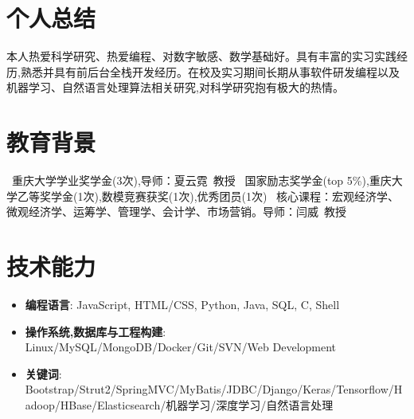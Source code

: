 \documentclass{resume}
\begin{document}


 
\section{个人总结}
本人热爱科学研究、热爱编程、对数字敏感、数学基础好。具有丰富的实习实践经历,熟悉并具有前后台全栈开发经历。在校及实习期间长期从事软件研发编程以及机器学习、自然语言处理算法相关研究,对科学研究抱有极大的热情。

\section{教育背景}
\ 重庆大学学业奖学金(3次),导师：夏云霓\ 教授
\ 国家励志奖学金(top 5\%),重庆大学乙等奖学金(1次),数模竞赛获奖(1次),优秀团员(1次)
\ 核心课程：宏观经济学、微观经济学、运筹学、管理学、会计学、市场营销。导师：闫威\ 教授

\section{技术能力}
\begin{itemize}[parsep=0.2ex]
  \item \textbf{编程语言}: JavaScript, HTML/CSS, Python, Java, SQL, C, Shell
  \item \textbf{操作系统,数据库与工程构建}: Linux/MySQL/MongoDB/Docker/Git/SVN/Web Development
  \item \textbf{关键词}: Bootstrap/Strut2/SpringMVC/MyBatis/JDBC/Django/Keras/Tensorflow/Hadoop/HBase/Elasticsearch/机器学习/深度学习/自然语言处理
\end{itemize}
\end{document}
